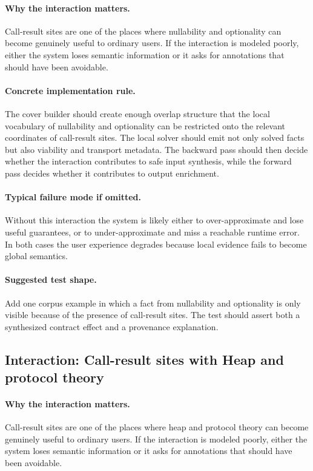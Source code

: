 \documentclass[11pt]{report}
\theoremstyle{definition}
\theoremstyle{plain}
\begin{document}
\paragraph{Why the interaction matters.}
Call-result sites are one of the places where nullability and optionality can become
genuinely useful to ordinary users. If the interaction is modeled poorly,
either the system loses semantic information or it asks for annotations that
should have been avoidable.

\paragraph{Concrete implementation rule.}
The cover builder should create enough overlap structure that the local
vocabulary of nullability and optionality can be restricted onto the relevant
coordinates of call-result sites. The local solver should emit not only
solved facts but also viability and transport metadata. The backward pass
should then decide whether the interaction contributes to safe input
synthesis, while the forward pass decides whether it contributes to output
enrichment.

\paragraph{Typical failure mode if omitted.}
Without this interaction the system is likely either to over-approximate and
lose useful guarantees, or to under-approximate and miss a reachable runtime
error. In both cases the user experience degrades because local evidence
fails to become global semantics.

\paragraph{Suggested test shape.}
Add one corpus example in which a fact from nullability and optionality is only
visible because of the presence of call-result sites. The test should
assert both a synthesized contract effect and a provenance explanation.

\subsection{Interaction: Call-result sites with Heap and protocol theory}

\paragraph{Why the interaction matters.}
Call-result sites are one of the places where heap and protocol theory can become
genuinely useful to ordinary users. If the interaction is modeled poorly,
either the system loses semantic information or it asks for annotations that
should have been avoidable.
\end{document}
